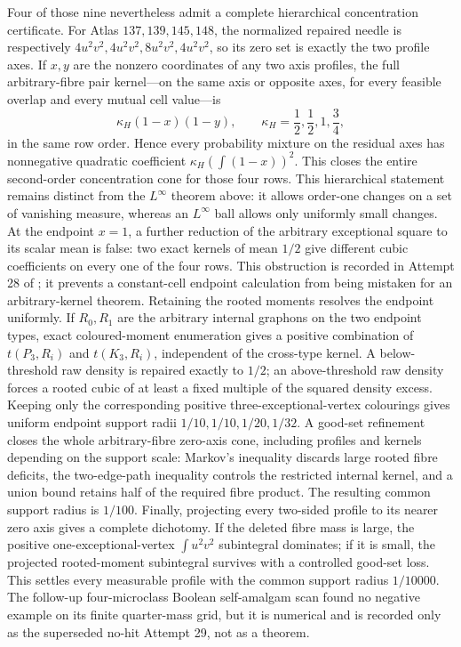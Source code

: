 \documentclass[11pt]{article}
\begin{document}
Four of those nine nevertheless admit a complete hierarchical concentration
certificate.  For Atlas $137,139,145,148$, the normalized repaired needle is
respectively $4u^2v^2,4u^2v^2,8u^2v^2,4u^2v^2$, so its zero set is exactly the
two profile axes.  If $x,y$ are the nonzero coordinates of any two axis
profiles, the full arbitrary-fibre pair kernel---on the same axis or opposite
axes, for every feasible overlap and every mutual cell value---is
\[
 \kappa_H(1-x)(1-y),
 \qquad
 \kappa_H=\frac12,\frac12,1,\frac34,
\]
in the same row order.  Hence every probability mixture on the residual axes
has nonnegative quadratic coefficient
$\kappa_H(\int(1-x))^2$.  This closes the entire second-order concentration
cone for those four rows.  This hierarchical statement remains distinct
from the $L^\infty$ theorem above: it allows order-one changes on a set of
vanishing measure, whereas an $L^\infty$ ball allows only uniformly small
changes.
At the endpoint $x=1$, a further reduction of the arbitrary exceptional
square to its scalar mean is false: two exact kernels of mean $1/2$ give
different cubic coefficients on every one of the four rows.  This obstruction
is recorded in Attempt 28 of ; it prevents a
constant-cell endpoint calculation from being mistaken for an
arbitrary-kernel theorem.  Retaining the rooted moments resolves the endpoint
uniformly.  If $R_0,R_1$ are the arbitrary internal graphons on the
two endpoint types, exact coloured-moment enumeration gives a positive
combination of $t(P_3,R_i)$ and $t(K_3,R_i)$, independent of the cross-type
kernel.  A below-threshold raw density is repaired exactly to $1/2$; an
above-threshold raw density forces a rooted cubic of at least a fixed multiple
of the squared density excess.  Keeping only the corresponding positive
three-exceptional-vertex colourings gives uniform endpoint support radii
$1/10,1/10,1/20,1/32$.  A good-set refinement closes the whole
arbitrary-fibre zero-axis cone, including profiles and kernels depending on
the support scale: Markov's inequality discards large rooted fibre deficits,
the two-edge-path inequality controls the restricted internal kernel, and a
union bound retains half of the required fibre product.  The resulting
common support radius is $1/100$.  Finally, projecting every two-sided
profile to its nearer zero axis gives a complete dichotomy.  If the deleted
fibre mass is large, the positive one-exceptional-vertex
$\int u^2v^2$ subintegral dominates; if it is small, the projected
rooted-moment subintegral survives with a controlled good-set loss.  This
settles every measurable profile with the common support radius $1/10000$.
The follow-up four-microclass Boolean self-amalgam scan found no negative
example on its finite quarter-mass grid, but it is numerical and is recorded
only as the superseded no-hit Attempt 29, not as a theorem.
\end{document}
